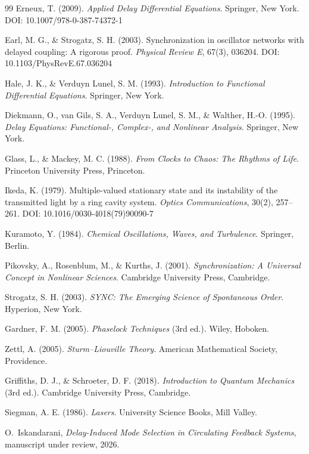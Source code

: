 \documentclass[11pt,a4paper]{article}
\begin{document}
    
    \begin{thebibliography}{99}
         Erneux, T. (2009). \textit{Applied Delay Differential Equations}. Springer, New York. DOI: 10.1007/978-0-387-74372-1

         Earl, M. G., \& Strogatz, S. H. (2003). Synchronization in oscillator networks with delayed coupling: A rigorous proof. \textit{Physical Review E}, 67(3), 036204. DOI: 10.1103/PhysRevE.67.036204

         Hale, J. K., \& Verduyn Lunel, S. M. (1993). \textit{Introduction to Functional Differential Equations}. Springer, New York.

         Diekmann, O., van Gils, S. A., Verduyn Lunel, S. M., \& Walther, H.-O. (1995). \textit{Delay Equations: Functional-, Complex-, and Nonlinear Analysis}. Springer, New York.

         Glass, L., \& Mackey, M. C. (1988). \textit{From Clocks to Chaos: The Rhythms of Life}. Princeton University Press, Princeton.

         Ikeda, K. (1979). Multiple-valued stationary state and its instability of the transmitted light by a ring cavity system. \textit{Optics Communications}, 30(2), 257--261. DOI: 10.1016/0030-4018(79)90090-7

         Kuramoto, Y. (1984). \textit{Chemical Oscillations, Waves, and Turbulence}. Springer, Berlin.

         Pikovsky, A., Rosenblum, M., \& Kurths, J. (2001). \textit{Synchronization: A Universal Concept in Nonlinear Sciences}. Cambridge University Press, Cambridge.

         Strogatz, S. H. (2003). \textit{SYNC: The Emerging Science of Spontaneous Order}. Hyperion, New York.

         Gardner, F. M. (2005). \textit{Phaselock Techniques} (3rd ed.). Wiley, Hoboken.

         Zettl, A. (2005). \textit{Sturm--Liouville Theory}. American Mathematical Society, Providence.

         Griffiths, D. J., \& Schroeter, D. F. (2018). \textit{Introduction to Quantum Mechanics} (3rd ed.). Cambridge University Press, Cambridge.

         Siegman, A. E. (1986). \textit{Lasers}. University Science Books, Mill Valley.
        
        O.~Iskandarani,
        \textit{Delay-Induced Mode Selection in Circulating Feedback Systems},
        manuscript under review, 2026.
    \end{thebibliography}
\end{document}
